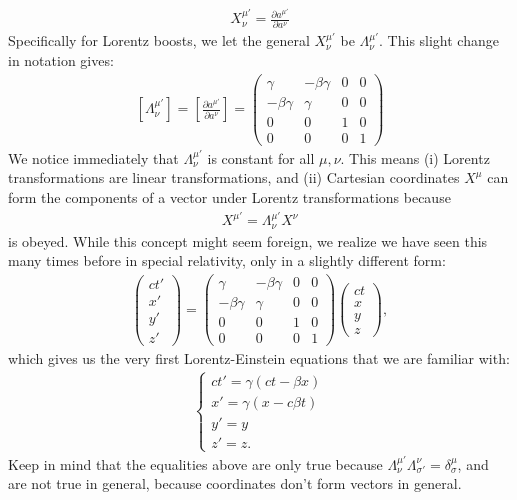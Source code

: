 \documentclass{article}
\theoremstyle{definition}
\begin{document}
\begin{align*}
\boxed{X^{\mu'}_\nu = \frac{\partial a^{\mu'}}{\partial a^\nu}}
\end{align*}
Specifically for Lorentz boosts, we let the general $X^{\mu'}_\nu$ be $\Lambda^{\mu'}_\nu$. This slight change in notation gives:
\begin{align*}
\boxed{[\Lambda^{\mu'}_\nu] = \left[ \frac{\partial a^{\mu'}}{\partial a^{\nu}}\right] = 
\begin{pmatrix}
\gamma & -\beta\gamma & 0 & 0\\
-\beta\gamma & \gamma & 0 & 0\\
0 & 0 & 1 & 0\\
0 & 0 & 0 & 1
\end{pmatrix}}
\end{align*}
We notice immediately that $\Lambda^{\mu'}_\nu$ is constant for all $\mu, \nu$. This means (i) Lorentz transformations are linear transformations, and (ii) Cartesian coordinates $X^{\mu}$ can form the components of a vector under Lorentz transformations because
\begin{align*}
X^{\mu'} = \Lambda^{\mu'}_\nu X^{\nu}
\end{align*} 
is obeyed. While this concept might seem foreign, we realize we have seen this many times before in special relativity, only in a slightly different form:
\begin{align*}
\begin{pmatrix}
ct'\\x'\\y'\\z'
\end{pmatrix}
=
\begin{pmatrix}
\gamma & -\beta\gamma & 0 & 0\\
-\beta\gamma & \gamma & 0 & 0\\
0 & 0 & 1 & 0\\
0 & 0 & 0 & 1
\end{pmatrix}
\begin{pmatrix}
ct\\x\\y\\z
\end{pmatrix},
\end{align*}
which gives us the very first Lorentz-Einstein equations that we are familiar with:
\begin{align*}
\begin{cases}
ct'= \gamma(ct-\beta x)\\
x'= \gamma(x - c\beta t)\\
y'= y\\
z'= z.
\end{cases}
\end{align*}
Keep in mind that the equalities above are only true because $\Lambda^{\mu'}_\nu \Lambda^{\nu}_{\sigma'} = \delta^\mu_\sigma$, and are not true in general, because coordinates don't form vectors in general.\\
\end{document}
